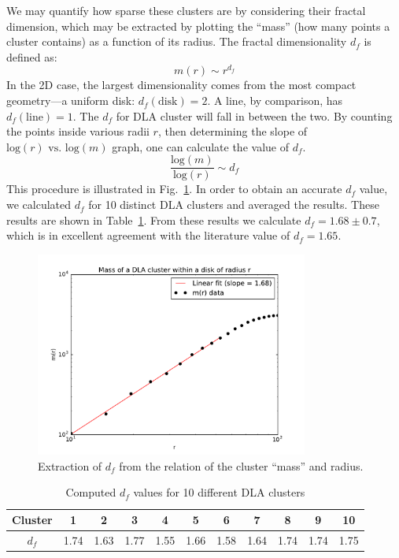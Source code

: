 \documentclass[aps,prl,preprint,superscriptaddress]{revtex4}
\begin{document}
We may quantify how sparse these clusters are by considering their fractal dimension, which may be extracted by plotting the ``mass'' (how many points a cluster contains) as a function of its radius. The fractal dimensionality $d_f$ is defined as:
\begin{equation}
m(r) \sim r^{d_f}
\end{equation}
In the 2D case, the largest dimensionality comes from the most compact geometry---a uniform disk: $d_f(\text{disk}) = 2$. A line, by comparison, has $d_f(\text{line}) = 1$. The $d_f$ for DLA cluster will fall in between the two. By counting the points inside various radii $r$, then determining the slope of $\text{log}(r)\text{ vs. }\text{log}(m)$ graph, one can calculate the value of $d_f$.
\begin{equation}
\frac{\text{log}(m) }{\text{log}(r)} \sim d_f
\end{equation}
 This procedure is illustrated in Fig.~\ref{df}. In order to obtain an accurate $d_f$ value, we calculated $d_f$ for 10 distinct DLA clusters and averaged the results. These results are shown in Table~\ref{df_table}. From these results we calculate $d_f =1.68\pm 0.7$, which is in excellent agreement with the literature value of $d_f = 1.65$.
\begin{figure}[H]
	\centering
	\includegraphics[width=0.8\textwidth]{mass_vs_R.pdf}
	\caption{Extraction of $d_f$ from the relation of the cluster ``mass'' and radius.}
	\label{df}
\end{figure}

\begin{table}[H]
\caption{Computed $d_f$ values for 10 different DLA clusters}
\label{df_table}
\begin{center}
\begin{tabular}{ |c|c|c|c|c|c|c|c|c|c|c| } 
 \hline
Cluster & 1 & 2 & 3 & 4 & 5 & 6 & 7 & 8 & 9 & 10 \\ 
\hline
 $d_f$& 1.74 & 1.63 & 1.77 & 1.55 & 1.66 & 1.58 & 1.64 & 1.74 & 1.74 & 1.75 \\ 
 \hline
\end{tabular}
\end{center}
\end{table}
 
\end{document}
